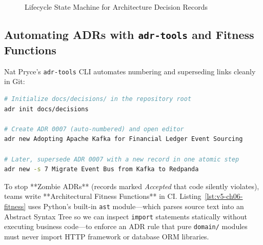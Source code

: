 \begin{figure}[htbp]
\centering
{}
\caption{Lifecycle State Machine for Architecture Decision Records}
\label{fig:v5-ch06-adr-lifecycle}
\end{figure}

\subsection{Automating ADRs with \texttt{adr-tools} and Fitness Functions}

Nat Pryce's \texttt{adr-tools} CLI automates numbering and superseding links cleanly in Git:
\begin{lstlisting}[language=bash, caption={Managing Numbered Superseding Chains with \texttt{adr-tools}}]
# Initialize docs/decisions/ in the repository root
adr init docs/decisions

# Create ADR 0007 (auto-numbered) and open editor
adr new Adopting Apache Kafka for Financial Ledger Event Sourcing

# Later, supersede ADR 0007 with a new record in one atomic step
adr new -s 7 Migrate Event Bus from Kafka to Redpanda
\end{lstlisting}

To stop **Zombie ADRs** (records marked \emph{Accepted} that code silently violates), teams write **Architectural Fitness Functions** in CI. Listing~\ref{lst:v5-ch06-fitness} uses Python's built-in \texttt{ast} module---which parses source text into an Abstract Syntax Tree so we can inspect \texttt{import} statements statically without executing business code---to enforce an ADR rule that pure \texttt{domain/} modules must never import HTTP framework or database ORM libraries.

